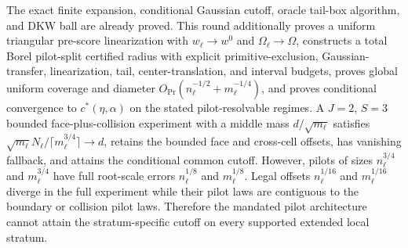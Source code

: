 The exact finite expansion, conditional Gaussian cutoff, oracle tail-box algorithm, and DKW ball are already proved.  This round additionally proves a uniform triangular pre-score linearization with \(w_\ell\to w^0\) and \(\Omega_\ell\to\Omega\), constructs a total Borel pilot-split certified radius with explicit primitive-exclusion, Gaussian-transfer, linearization, tail, center-translation, and interval budgets, proves global uniform coverage and diameter \(O_{\Pr}(n_\ell^{-1/2}+m_\ell^{-1/4})\), and proves conditional convergence to \(c^*(\eta,\alpha)\) on the stated pilot-resolvable regimes.  A \(J=2\), \(S=3\) bounded face-plus-collision experiment with a middle mass \(d/\sqrt{m_\ell}\) satisfies \(\sqrt{m_\ell}N_\ell/\lceil m_\ell^{3/4}\rceil\to d\), retains the bounded face and cross-cell offsets, has vanishing fallback, and attains the conditional common cutoff.  However, pilots of sizes \(n_\ell^{3/4}\) and \(m_\ell^{3/4}\) have full root-scale errors \(n_\ell^{1/8}\) and \(m_\ell^{1/8}\).  Legal offsets \(n_\ell^{1/16}\) and \(m_\ell^{1/16}\) diverge in the full experiment while their pilot laws are contiguous to the boundary or collision pilot laws.  Therefore the mandated pilot architecture cannot attain the stratum-specific cutoff on every supported extended local stratum.
